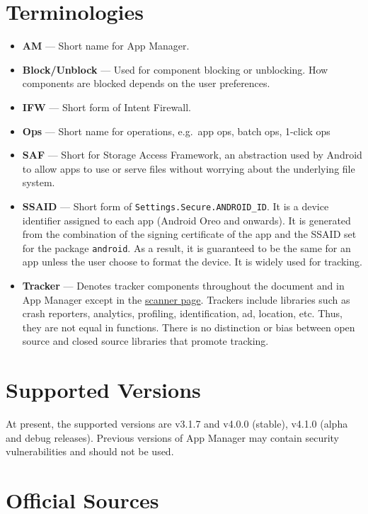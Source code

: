 \section{Terminologies}\label{sec:terminologies} %
\begin{itemize}
    \item \textbf{AM} --- Short name for App Manager.
    \item \textbf{Block/Unblock} --- Used for component blocking or unblocking. How components are blocked depends on
    the user preferences.
    \item \textbf{IFW} --- Short form of Intent Firewall.
    \item \textbf{Ops} --- Short name for operations, e.g.\ app ops, batch ops, 1-click ops
    \item \textbf{SAF} --- Short for Storage Access Framework, an abstraction used by Android to allow apps to use or
    serve files without worrying about the underlying file system.
    \item \textbf{SSAID} --- Short form of \texttt{Settings.Secure.ANDROID\_ID}. It is a device identifier assigned to
    each app (Android Oreo and onwards). It is generated from the combination of the signing certificate of the app
    and the SSAID set for the package \texttt{android}. As a result, it is guaranteed to be the same for an app unless
    the user choose to format the device. It is widely used for tracking.
    \item \textbf{Tracker} --- Denotes tracker components throughout the document and in App Manager except in the
    \hyperref[sec:scanner-page]{scanner page}. Trackers include libraries such as crash reporters, analytics,
    profiling, identification, ad, location, etc. Thus, they are not equal in functions. There is no distinction or bias
    between open source and closed source libraries that promote tracking.
\end{itemize}


\section{Supported Versions}\label{sec:supported-versions} %
At present, the supported versions are v3.1.7 and v4.0.0 (stable), v4.1.0 (alpha and debug releases).
Previous versions of App Manager may contain security vulnerabilities and should not be used.


\section{Official Sources}\label{sec:official-sources} %

